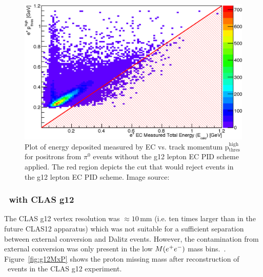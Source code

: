 \begin{figure}\begin{center}
											\includegraphics[width=0.8\figwidth]{figures/lepton/Pip_EChighcut.eps}
											\caption[EC Deposited Energy Comparison to Track Momentum for $e^+$ from $\pi^0$ Events]{\label{fig:islep.pipECcut}Plot of energy deposited measured by EC vs. track momentum p$\mathrm{_{thres}^{high}}$ for positrons from $\pi^0$ events without the g12 lepton EC PID scheme applied. The red region depicts the cut that would reject events in the g12 lepton EC PID scheme. Image source:~\cite{thesiskunkel}}
\end{center}\end{figure}																											
\FloatBarrier
\subsubsection{\etaPDal \  with CLAS g12}
The CLAS g12 vertex resolution was $\approx 10\,\mathrm{mm}$ (i.e. ten times larger than in the future CLAS12 apparatus) which was not suitable for a sufficient separation between external conversion and Dalitz events. However, the contamination from external conversion was only present in the low $M(e^+e^-)$ mass bins.~\cite{thesisschever}.	Figure~\ref{fig:g12MxP} shows the proton missing mass after reconstruction of  \etaPDal \  events in the CLAS g12 experiment.

